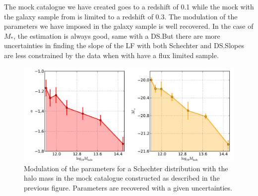 The mock catalogue we have created goes to a redshift of 0.1 while the
mock with the galaxy sample from \citet{Guo+11} is limited to a redshift of
0.3. The modulation of the parameters we have imposed in the galaxy
sample is well recovered. In the case of $M_*$, the estimation is always good,
same with a DS.\@ But there are more uncertainties in finding the slope of the
LF with both Schechter and DS.\@ Slopes are less constrained by the data when
with have a flux limited sample.
%
\begin{figure}[htb]
    \centering
    \includegraphics[width=0.8\linewidth]{figures/lf/evolSchechterLinMockGalPop}
    \caption{Modulation of the parameters for a Schechter distribution with the
    halo mass in the mock catalogue constructed as described in the previous
figure. Parameters are recovered with a given uncertainties.}
\label{fig:paramschlinmock}
\end{figure}
